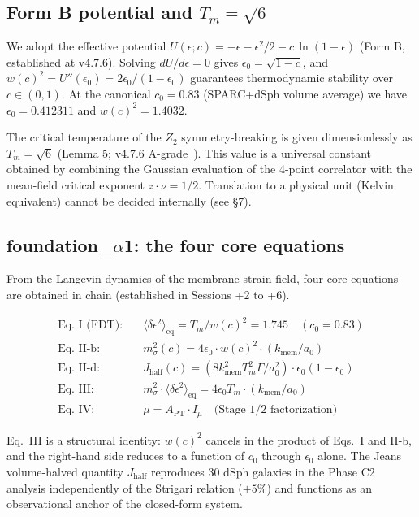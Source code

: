 \documentclass[11pt,a4paper]{article}
\newcommand{\epso}{\epsilon_0}
\newcommand{\kmem}{k_{\mathrm{mem}}}
\newcommand{\Tm}{T_{m}}
\newcommand{\Imu}{I_{\mu}}
\newcommand{\APT}{A_{\mathrm{PT}}}
\newcommand{\msigma}{m_{\sigma}}
\newcommand{\Jhalf}{J_{\mathrm{half}}}
\begin{document}
\subsection{Form B potential and $\Tm = \sqrt{6}$}
We adopt the effective potential
$U(\epsilon; c) = -\epsilon - \epsilon^2/2 - c\,\ln(1 - \epsilon)$ (Form B, established at v4.7.6).
Solving $dU/d\epsilon = 0$ gives $\epso = \sqrt{1 - c}$, and $w(c)^2 = U''(\epso) = 2\epso/(1 - \epso)$
guarantees thermodynamic stability over $c \in (0, 1)$. At the canonical $c_0 = 0.83$ (SPARC+dSph
volume average) we have $\epso = 0.412311$ and $w(c)^2 = 1.4032$.

The critical temperature of the $Z_2$ symmetry-breaking is given dimensionlessly as
$\Tm = \sqrt{6}$ (Lemma 5; v4.7.6 A-grade~\citep{v476internal}). This value is a universal constant
obtained by combining the Gaussian evaluation of the 4-point correlator with the mean-field
critical exponent $z \cdot \nu = 1/2$. Translation to a physical unit (Kelvin equivalent) cannot be
decided internally (see \S 7).

\subsection{foundation\_$\alpha$1: the four core equations}
From the Langevin dynamics of the membrane strain field, four core equations are obtained in chain
(established in Sessions +2 to +6).

\begin{keybox}
\begin{align*}
\text{Eq.~I (FDT):}\quad &\langle \delta\epsilon^2 \rangle_{\mathrm{eq}} = \Tm / w(c)^2 = 1.745 \quad (c_0 = 0.83) \\
\text{Eq.~II-b:}\quad &\msigma^2(c) = 4\epso \cdot w(c)^2 \cdot (\kmem / a_0) \\
\text{Eq.~II-d:}\quad &\Jhalf(c) = (8\kmem^2 \Tm^2 \Gamma / a_0^2) \cdot \epso(1 - \epso) \\
\text{Eq.~III:}\quad &\msigma^2 \cdot \langle \delta\epsilon^2 \rangle_{\mathrm{eq}} = 4\epso\Tm \cdot (\kmem / a_0) \\
\text{Eq.~IV:}\quad &\mu = \APT \cdot \Imu \quad \text{(Stage 1/2 factorization)}
\end{align*}
\end{keybox}

Eq.~III is a structural identity: $w(c)^2$ cancels in the product of Eqs.~I and II-b, and the
right-hand side reduces to a function of $c_0$ through $\epso$ alone. The Jeans volume-halved
quantity $\Jhalf$ reproduces 30 dSph galaxies in the Phase C2 analysis independently of the Strigari
relation ($\pm 5\%$) and functions as an observational anchor of the closed-form system.
\end{document}
